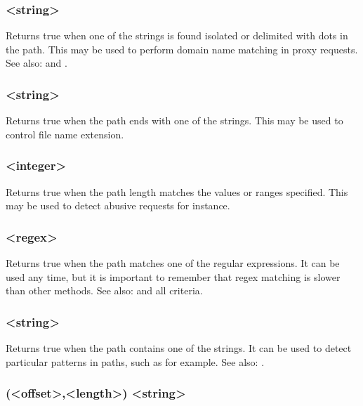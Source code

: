 \subsubsection[path\_dom]{ <string>}

  Returns true when one of the strings is found isolated or delimited with dots
  in the path. This may be used to perform domain name matching in proxy
  requests.
See also:  and .

\subsubsection[path\_end]{ <string>}

  Returns true when the path ends with one of the strings. This may be used to
  control file name extension.

\subsubsection[path\_len]{ <integer>}

  Returns true when the path length matches the values or ranges specified.
  This may be used to detect abusive requests for instance.

\subsubsection[path\_reg]{ <regex>}

  Returns true when the path matches one of the regular expressions. It can be
  used any time, but it is important to remember that regex matching is slower
  than other methods.
See also:  and all  criteria.

\subsubsection[path\_sub]{ <string>}

  Returns true when the path contains one of the strings. It can be used to
  detect particular patterns in paths, such as  for example.
See also:   .

\subsubsection[payload]{(<offset>,<length>) <string>}

